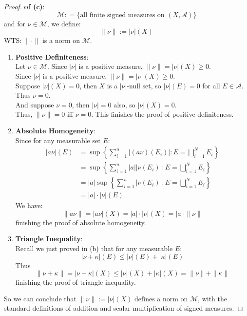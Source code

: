 \documentclass[lang=cn,11pt]{elegantbook}
\begin{document}
\begin{proof}
   \textbf{ of (c)}:
\[
\mathcal{M} : = \{ \text{all finite signed measures on }(X, \mathcal{A})\}
\]
and for $\nu \in \mathcal{M}$, we define:  \[
\|\nu\| := |\nu|(X)
\]
WTS: $\| \cdot \|$ is a norm on $\mathcal{M}$.\\
\begin{enumerate}
    \item \textbf{Positive Definiteness}:\\Let $\nu \in \mathcal{M}$. Since $|\nu|$ is a positive measure, \( \|\nu\| =   |\nu| (X) \geq 0\).\\Since $|\nu|$ is a positive measure, \( \|\nu\| =   |\nu| (X) \geq 0\).\\
Suppose $ |\nu|(X) = 0 $, then $X$ is a $|\nu|$-null set, so $|\nu|(E) = 0$ for all $E \in \mathcal{A}$. Thus $\nu = 0$.\\
And suppose $\nu = 0 $, then $|\nu | = 0$ also, so $|\nu|(X) = 0$.\\
Thus, \(\|\nu\| = 0\) iff \(\nu = 0\). This finishes the proof of positive definiteness.
\item \textbf{Absolute Homogeneity}: \\Since for any measurable set \(E\):
\begin{align*}
    |a \nu|(E) &= \sup \left\{ \sum_{i=1}^n |(a \nu)(E_i)| : E= \bigsqcup_{i=1}^N E_i\right\}\\
&= \sup \left\{ \sum_{i=1}^n |a||\nu(E_i)|: E= \bigsqcup_{i=1}^N E_i \right\}\\
& = |a| \sup \left\{ \sum_{i=1}^n |\nu(E_i)|: E= \bigsqcup_{i=1}^N E_i \right\}\\
&= |a| \cdot |\nu|(E)
\end{align*}
We have: \[
\|a \nu\| = |a \nu|(X) = |a| \cdot |\nu|(X) = |a| \cdot \|\nu\|
\]
finishing the proof of absolute homogeneity.
\item \textbf{Triangle Inequality}:\\
Recall we just proved in (b) that for any measurable $E$:\[
  |\nu+\kappa|(E) \le |\nu|(E)+|\kappa|(E) 
\]Thus \[
\|\nu + \kappa\| = |\nu + \kappa|(X) \le |\nu|(X) + |\kappa|(X)=  \|\nu\| + \|\kappa\|
\]
finishing the proof of triangle inequality.\\
\end{enumerate}
So we can conclude that \(\|\nu\| := |\nu|(X) \text{ defines a norm on } \mathcal{M}\), with the standard definitions of addition and scalar multiplication of signed measures.
\end{proof}
\end{document}
